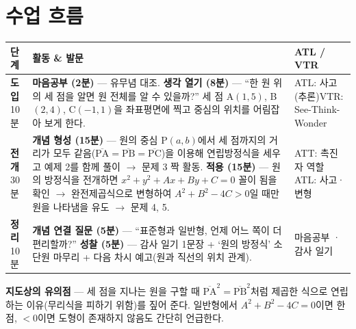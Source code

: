 \documentclass[11pt,a4paper]{article}
\begin{document}
\section{수업 흐름}
\begin{tabularx}{\linewidth}{@{}>{\centering\arraybackslash}p{1.6cm}X>{\raggedright\arraybackslash\small}p{3.1cm}@{}}
\toprule
\textbf{단계} & \textbf{활동 \& 발문} & \textbf{ATL / VTR} \\
\midrule
\textcolor{goldstrong}{\textbf{도입}}\newline\footnotesize 10분 &
\textbf{마음공부 (2분)} --- 유무념 대조.\newline
\textbf{생각 열기 (8분)} --- ``한 원 위의 세 점을 알면 원 전체를 알 수 있을까?'' 세 점 A$(1,5)$, B$(2,4)$, C$(-1,1)$을 좌표평면에 찍고 중심의 위치를 어림잡아 보게 한다. &
ATL: 사고(추론)\newline VTR: See-Think-Wonder \\
\addlinespace
\textcolor{goldstrong}{\textbf{전개}}\newline\footnotesize 30분 &
\textbf{개념 형성 (15분)} --- 원의 중심 P$(a,b)$에서 세 점까지의 거리가 모두 같음($\overline{\text{PA}}=\overline{\text{PB}}=\overline{\text{PC}}$)을 이용해 연립방정식을 세우고 예제 2를 함께 풀이 $\to$ 문제 3 짝 활동.\newline
\textbf{적용 (15분)} --- 원의 방정식을 전개하면 $x^2+y^2+Ax+By+C=0$ 꼴이 됨을 확인 $\to$ 완전제곱식으로 변형하여 $A^2+B^2-4C>0$일 때만 원을 나타냄을 유도 $\to$ 문제 4, 5. &
ATT: 촉진자 역할\newline ATL: 사고·변형 \\
\addlinespace
\textcolor{goldstrong}{\textbf{정리}}\newline\footnotesize 10분 &
\textbf{개념 연결 질문 (5분)} --- ``표준형과 일반형, 언제 어느 쪽이 더 편리할까?''\newline
\textbf{성찰 (5분)} --- 감사 일기 1문장 + `원의 방정식' 소단원 마무리 + 다음 차시 예고(원과 직선의 위치 관계). &
마음공부 · 감사 일기 \\
\bottomrule
\end{tabularx}

\begin{calloutbox}
\textbf{지도상의 유의점} --- 세 점을 지나는 원을 구할 때 $\overline{\text{PA}}^2=\overline{\text{PB}}^2$처럼 제곱한 식으로 연립하는 이유(무리식을 피하기 위함)를 짚어 준다. 일반형에서 $A^2+B^2-4C=0$이면 한 점, $<0$이면 도형이 존재하지 않음도 간단히 언급한다.
\end{calloutbox}
\end{document}
